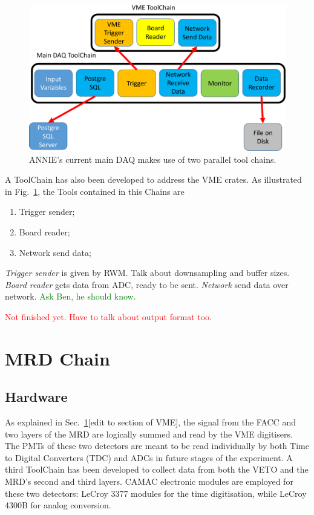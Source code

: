 \begin{figure}[]
  \centering
  \includegraphics[scale=0.20]{pics/pag2richardshkmeeting}
  \caption{ANNIE's current main DAQ makes use of two parallel tool chains.}
  \label{fig:anniedaq}
\end{figure}

A ToolChain has also been developed to address the VME crates.
As illustrated in Fig.~\ref{fig:anniedaq}, the Tools contained in this Chains are
\begin{enumerate}
  \item Trigger sender;
  \item Board reader;
  \item Network send data;
\end{enumerate}

\emph{Trigger sender} is given by RWM.
Talk about downsampling and buffer sizes.
\emph{Board reader} gets data from ADC, ready to be sent.
\emph{Network} send data over network.
\textcolor{green}{Ask Ben, he should know.}

\textcolor{red}{Not finished yet. Have to talk about output format too.}

\section{MRD Chain}
\label{sec:3.2}

\subsection{Hardware}

As explained in Sec.~\ref{sec:3.2}[edit to section of VME], the signal from the FACC %
and two layers of the MRD are logically summed and read by the VME digitisers.
The PMTs of these two detectors are meant to be read individually by both Time to Digital %
Converters (TDC) and ADCs in future stages of the experiment.
A third ToolChain has been developed to collect data from both the VETO and %
the MRD's second and third layers.
CAMAC electronic modules are employed for these two detectors: LeCroy 3377 modules for the time %
digitisation, while LeCroy 4300B for analog conversion.


